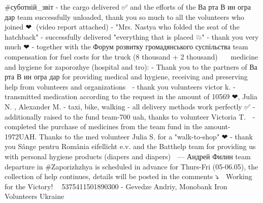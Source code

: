  
 
 
 
 

#суботній_звіт
- the cargo delivered ✅ and the efforts of the Ва рта В ин огра дар team successfully unloaded, thank you so much to all the volunteers who joined ❤🤝 (video report attached)
- "Mrs. Nastya who folded the seat of the hatchback" - successfully delivered "everything that is placed 💥" - thank you very much ❤
- together with the Форум розвитку громадянського суспільства team compensation for fuel costs for the truck (8 thousand + 2 thousand) 🚛🚚
💊 medicine and hygiene for zaporozhye (hospital and tro):
- Thank you to the partners of Ва рта В ин огра дар for providing medical and hygiene, receiving and preserving help from volunteers and organizations 🥰
- thank you volunteers victor k. - transmitted medication according to the request in the amount of 10569 ❤, Julia N. , Alexander M. - taxi, bike, walking - all delivery methods work perfectly ✅
- additionally raised to the fund team-700 uah, thanks to volunteer Victoria T. 🙏
- completed the purchase of medicines from the team fund in the amount-1972UAH. Thanks to the med volunteer Julia S. for a "walk-to-shop" ❤
- thank you Sânge pentru România eifellicht e.v. and the Batthelp team for providing us with personal hygiene products (diapers and diapers) 🥰
---
Андрей Филин team departure in #Zaporizhzhya is scheduled in advance for Thurs-Fri (05-06.05), the collection of help continues, details will be posted in the comments ⤵️
🙌 Working for the Victory! 💙💛
5375411501890300 - Gevedze Andriy, Monobank
Iron Volunteers Ukraine
